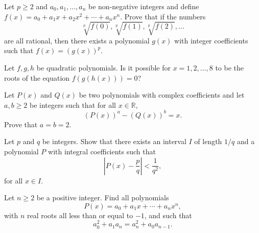 \documentclass[12pt,a4paper]{memoir}
\theoremstyle{definition}
\begin{document}
	
	
	

\begin{question}[name={1995 UNESCO}]
	Let $p\geq 2$ and $a_0,a_1,\dots,a_n$ be non-negative integers and define $f(x)=a_0+a_1x+a_2x^2+\cdots+a_nx^n$. Prove that if the numbers 
	\[\sqrt[p]{f(0)}, \sqrt[p]{f(1)}, \sqrt[p]{f(2)}, \dots\]
	are all rational, then there exists a polynomial $g(x)$ with integer coefficients such that $f(x)=(g(x))^p$. 
\end{question}


\begin{question}[name={1995 Russia}]
	Let $f,g,h$ be quadratic polynomials. Is it possible for $x=1,2,\dots,8$ to be the roots of the equation $f(g(h(x)))=0$?
\end{question}

\begin{question}[name={1998 Iran}]
	Let $P(x)$ and $Q(x)$ be two polynomials with complex coefficients and let $a,b\geq 2$ be integers such that for all $x\in\mathbb R$,
	\[\left(P(x)\right)^a-\left(Q(x)\right)^b = x.\]
	Prove that $a=b=2$.
\end{question}

\begin{question}[name={1983 IMO Longlist}]
	Let $p$ and $q$ be integers. Show that there exists an interval $I$ of length $1/q$ and a polynomial $P$ with integral coefficients such that
	\[ \left|P(x)-\frac pq \right| < \frac{1}{q^2},\] for all $x \in I.$
\end{question}

\begin{question}[name={1998 Poland}]
	Let $n\geq 2$ be a positive integer. Find all polynomials \[P(x)=a_0+a_1x+\cdots+a_nx^n,\] with $n$ real roots all less than or equal to $-1$, and such that
	\[a_0^2+a_1a_n=a_n^2+a_{0}a_{n-1}.\]
\end{question}
\end{document}
